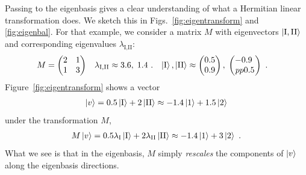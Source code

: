 \documentclass[12pt]{article}
\begin{document}
Passing to the eigenbasis gives a clear understanding of what a Hermitian linear transformation does. We sketch this in Figs.~\ref{fig:eigentransform} and \ref{fig:eigenbal}. For that example, we consider a matrix $M$ with eigenvectors $\left|{\textnormal{I},\textnormal{II}}\right\rangle$ and corresponding eigenvalues $\lambda_{\text{I},\text{II}}$:
\begin{align}
    M &= \begin{pmatrix}
        2 & 1 \\
        1 & 3
    \end{pmatrix}
    &
    \lambda_{\textnormal{I},\textnormal{II}} &\approx 3.6,\; 1.4 \ .
    &
    \left|\textnormal{I}\right\rangle,\left|\textnormal{II}\right\rangle&\approx
    \begin{pmatrix}
        0.5 \\ 0.9
    \end{pmatrix},
    \;
    \begin{pmatrix}
        -0.9 \ \\pp 0.5
    \end{pmatrix} \ .
\end{align}
Figure~\ref{fig:eigentransform} shows a vector 
\begin{align}
    \left|v\right\rangle = 0.5\left|\textnormal{I}\right\rangle + 2\left|\textnormal{II}\right\rangle \approx
    -1.4\left|1\right\rangle + 1.5 \left|2\right\rangle 
    \label{eq:eigen:example:v}
\end{align}
under the transformation $M$,
\begin{align}
    M\left|v\right\rangle = 0.5\lambda_\textnormal{I}\left|\textnormal{I}\right\rangle + 2 \lambda_\textnormal{II}\left|\textnormal{II}\right\rangle \approx
    -1.4\left|1\right\rangle + 3 \left|2\right\rangle \ .
    \label{eq:eigen:example:Mv}
\end{align}
What we see is that in the eigenbasis, $M$ simply \emph{rescales} the components of $\left|v\right\rangle$ along the eigenbasis directions. 
\end{document}
